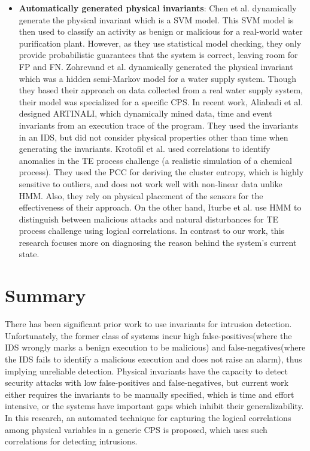 \begin{itemize}
\item \textbf{Automatically generated physical invariants}: Chen et al. \cite{chen2018learning} dynamically generate the physical invariant which is a \ac{SVM} model. This \ac{SVM} model is then used to classify an activity as benign or malicious for a real-world water purification plant. However, as they use statistical model checking, they only provide probabilistic guarantees that the system is correct, leaving room for \acf{FP} and \acf{FN}. Zohrevand et al. \cite{zohrevand2016hidden} dynamically generated the physical invariant which was a hidden semi-Markov model for a water supply system. Though they based their approach on  data collected from a real water supply system, their model was specialized for a specific \ac{CPS}. In recent work, Aliabadi et al. \cite{aliabadi2017artinali} designed ARTINALI, which dynamically mined data, time and event invariants from an execution trace of the program. They used the invariants in an \ac{IDS}, but did not consider physical properties other than time when generating the invariants. Krotofil et al. \cite{krotofil2015process} used correlations to identify anomalies in the \ac{TE} process challenge (a realistic simulation of a chemical process). They used the \acf{PCC} for deriving the cluster entropy, which is highly sensitive to outliers, and does not work well with non-linear data unlike \ac{HMM}. Also, they rely on physical placement of the sensors for the effectiveness of their approach. On the other hand, Iturbe et al. \cite{iturbe2017feasibility} use \ac{HMM} to distinguish between malicious attacks and natural disturbances for \ac{TE} process challenge using logical correlations. In contrast to our work, this research focuses more on diagnosing the reason behind the system's current state. 
\end{itemize}

\section{Summary}
There has been significant prior work to use invariants for intrusion detection. Unfortunately, the former class of systems incur high false-positives(where the IDS wrongly marks a benign execution to be malicious) and false-negatives(where the IDS fails to identify a malicious execution and does not raise an alarm), thus implying unreliable detection. Physical invariants have the capacity to detect security attacks with low false-positives and false-negatives, but current work either requires the invariants to be manually specified, which is time and effort intensive, or the systems have important gaps which inhibit their generalizability. In this research, an automated technique for capturing the logical correlations among physical variables in a generic \ac{CPS} is proposed, which uses such correlations for detecting intrusions.

\endinput
